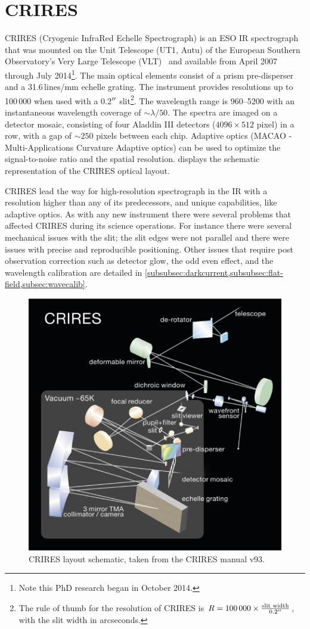 \section{CRIRES}
\label{sec:CRIRES}
CRIRES (Cryogenic InfraRed Echelle Spectrograph) is an ESO {IR} spectrograph that was mounted on the Unit Telescope (UT1, Autu) of the European Southern Observatory's Very Large Telescope (VLT)~\citep{kaeufl_crires_2004} and available from April 2007 through July 2014\footnote{Note this PhD research began in October 2014.}.
The main optical elements consist of a prism pre-disperser and a 31.6\,lines/mm echelle grating.
The instrument provides resolutions up to 100\,000 when used with a 0.2$^{\prime\prime}$ slit\footnote{The rule of thumb for the resolution of CRIRES is \(R=100\,000 \times \frac{\textrm{slit width}}{0.2^{\prime\prime}}\), with the slit width in arcseconds.}.
The wavelength range is 960--5200\nm{} with an instantaneous wavelength coverage of \(\sim \lambda/50\).
The spectra are imaged on a detector mosaic, consisting of four Aladdin III detectors (\(4096 \times 512\) pixel) in a row, with a gap of \(\sim 250\) pixels between each chip.
Adaptive optics (MACAO - Multi-Applications Curvature Adaptive optics) can be used to optimize the signal-to-noise ratio and the spatial resolution.
 displays the schematic representation of the CRIRES optical layout.

CRIRES lead the way for high-resolution spectrograph in the {IR} with a resolution higher than any of its predecessors, and unique capabilities, like adaptive optics.
As with any new instrument there were several problems that affected CRIRES during its science operations.
For instance there were several mechanical issues with the slit; the slit edges were not parallel and there were issues with precise and reproducible positioning.
Other issues that require post observation correction such as detector glow, the odd even effect, and the wavelength calibration are detailed in \cref{subsubsec:darkcurrent,subsubsec:flat-field,subsec:wavecalib}.

\begin{figure}
    \centering
    \includegraphics[width=0.7\linewidth]{figures/spectroscopy/CRIRES_schematic.pdf}
    \caption{CRIRES layout schematic, taken from the CRIRES manual v93.}
    \label{fig:criresschematic}
\end{figure}


